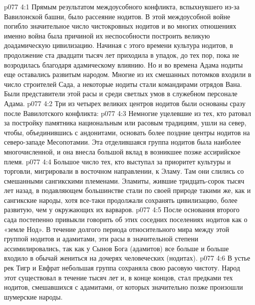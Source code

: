 \vs p077 4:1 Прямым результатом междоусобного конфликта, вспыхнувшего из\hyp{}за Вавилонской башни, было рассеяние нодитов. В этой междоусобной войне погибло значительное число чистокровных нодитов и во многих отношениях именно война была причиной их неспособности построить великую доадамическую цивилизацию. Начиная с этого времени культура нодитов, в продолжение ста двадцати тысяч лет приходила в упадок, до тех пор, пока не возродилась благодаря адамическому влиянию. Но и во времена Адама нодиты еще оставались развитым народом. Многие из их смешанных потомков входили в число строителей Сада, а некоторые нодиты стали командирами отрядов Вана. Были представители этой расы и среди светлых умов в служебном персонале Адама.
\vs p077 4:2 Три из четырех великих центров нодитов были основаны сразу после Вавилотского конфликта:
\vs p077 4:3 \bibnobreakspace {} Немногие уцелевшие из тех, кто ратовал за постройку памятника национальным или расовым традициям, ушли на север, чтобы, объединившись с андонитами, основать более поздние центры нодитов на северо\hyp{}западе Месопотамии. Эта отделившаяся группа нодитов была наиболее многочисленной, и она внесла большой вклад в возникшее позже ассирийское племя.
\vs p077 4:4 \bibnobreakspace {} Большое число тех, кто выступал за приоритет культуры и торговли, мигрировали в восточном направлении, к Эламу. Там они слились со смешанными сангикскими племенами. Эламиты, жившие тридцать\hyp{}сорок тысяч лет назад, в подавляющем большинстве стали по своей природе такими же, как и сангикские народы, хотя все\hyp{}таки продолжали сохранять цивилизацию, более развитую, чем у окружающих их варваров.
\vs p077 4:5 После основания второго сада постепенно привыкли говорить об этих соседних поселениях нодитов как о «земле Нод». В течение долгого периода относительного мира между этой группой нодитов и адамитами, эти расы в значительной степени ассимилировались, так как у Сынов Бога (адамитов) все больше и больше входило в обычай жениться на дочерях человеческих (нодитах).
\vs p077 4:6 \bibnobreakspace {} В устье рек Тигр и Евфрат небольшая группа сохраняла свою расовую чистоту. Народ этот существовал в течение тысяч лет и, в конце концов, стал предками тех нодитов, смешавшихся с адамитами, от которых значительно позже произошли шумерские народы.
